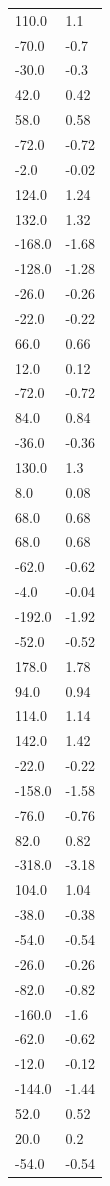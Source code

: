 \begin{longtable}{ll}
110.0 & 1.1 \\
-70.0 & -0.7 \\
-30.0 & -0.3 \\
42.0 & 0.42 \\
58.0 & 0.58 \\
-72.0 & -0.72 \\
-2.0 & -0.02 \\
124.0 & 1.24 \\
132.0 & 1.32 \\
-168.0 & -1.68 \\
-128.0 & -1.28 \\
-26.0 & -0.26 \\
-22.0 & -0.22 \\
66.0 & 0.66 \\
12.0 & 0.12 \\
-72.0 & -0.72 \\
84.0 & 0.84 \\
-36.0 & -0.36 \\
130.0 & 1.3 \\
8.0 & 0.08 \\
68.0 & 0.68 \\
68.0 & 0.68 \\
-62.0 & -0.62 \\
-4.0 & -0.04 \\
-192.0 & -1.92 \\
-52.0 & -0.52 \\
178.0 & 1.78 \\
94.0 & 0.94 \\
114.0 & 1.14 \\
142.0 & 1.42 \\
-22.0 & -0.22 \\
-158.0 & -1.58 \\
-76.0 & -0.76 \\
82.0 & 0.82 \\
-318.0 & -3.18 \\
104.0 & 1.04 \\
-38.0 & -0.38 \\
-54.0 & -0.54 \\
-26.0 & -0.26 \\
-82.0 & -0.82 \\
-160.0 & -1.6 \\
-62.0 & -0.62 \\
-12.0 & -0.12 \\
-144.0 & -1.44 \\
52.0 & 0.52 \\
20.0 & 0.2 \\
-54.0 & -0.54 \\

\end{longtable}
